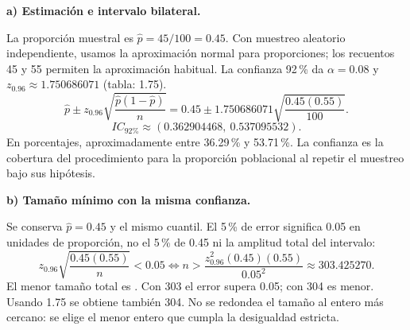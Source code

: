 \textbf{a) Estimación e intervalo bilateral.}\par\nopagebreak[4]
La proporción muestral es $\widehat p=45/100=0.45$. Con muestreo aleatorio independiente, usamos la aproximación normal para proporciones; los recuentos 45 y 55 permiten la aproximación habitual. La confianza 92\,\% da $\alpha=0.08$ y $z_{0.96}\approx1.750686071$ (tabla: 1.75).
\[
\widehat p\pm z_{0.96}\sqrt{\frac{\widehat p(1-\widehat p)}n}
=0.45\pm1.750686071\sqrt{\frac{0.45(0.55)}{100}}.
\]
\[
\boxed{IC_{\text{92\%}}\approx(0.362904468,\ 0.537095532).}
\]
En porcentajes, aproximadamente entre 36.29\,\% y 53.71\,\%. La confianza es la cobertura del procedimiento para la proporción poblacional al repetir el muestreo bajo sus hipótesis.

\textbf{b) Tamaño mínimo con la misma confianza.}\par\nopagebreak[4]
Se conserva $\widehat p=0.45$ y el mismo cuantil. El 5\,\% de error significa 0.05 en unidades de proporción, no el 5\,\% de 0.45 ni la amplitud total del intervalo:
\[
z_{0.96}\sqrt{\frac{0.45(0.55)}n}<0.05
\iff n>\frac{z_{0.96}^2(0.45)(0.55)}{0.05^2}
\approx303.425270.
\]
El menor tamaño total es . Con 303 el error supera 0.05; con 304 es menor. Usando 1.75 se obtiene también 304. No se redondea el tamaño al entero más cercano: se elige el menor entero que cumpla la desigualdad estricta.
